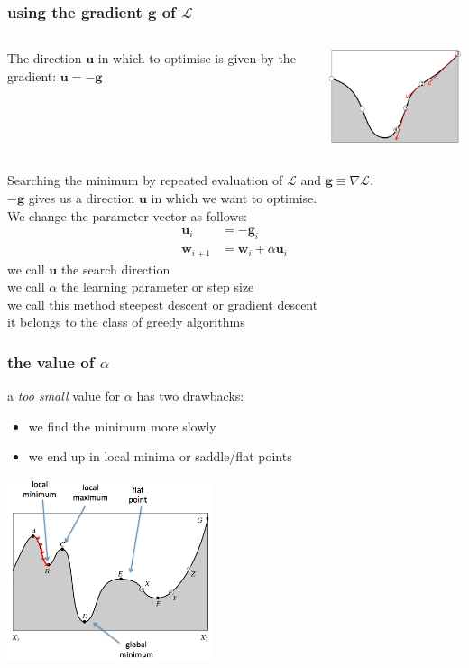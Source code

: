 \documentclass[USenglish,pdftex,compress,10pt,svgnamesi,handout]{beamer}
\def\Vec#1{\textbf{#1}}
\begin{document}
\begin{frame}
\frametitle{using the gradient $\Vec g$ of $\mathcal L$}

\begin{columns}
\begin{column}{5cm}
The direction $\Vec u$ in which to optimise is given by the gradient: $\Vec u = -\Vec g$
\end{column}
\begin{column}{5cm}
\centerline{\includegraphics[width=5cm]{pics/optimise5.png}}
\end{column}
\end{columns}
Searching the minimum by repeated evaluation of $\mathcal L$ and $\Vec g \equiv \nabla \mathcal L$. \\
$-\Vec g$ 
gives us a direction $\Vec u$  in which we want to optimise.  \\
We change the parameter vector as follows:
\begin{align}
\Vec u_i &= -\Vec g_i \\
\Vec w_{i+1} &= \Vec w_i +  \alpha \Vec u_i 
\end{align}
we call $\Vec u$ the \alert{search direction}\\
we call $\alpha$ the \alert{learning parameter} or \alert{step size}\\
we call this method \alert{steepest descent} or \alert{gradient descent}\\
it belongs to the class of {greedy algorithms}
\end{frame}



\begin{frame}
\frametitle{the value of $\alpha$}

a \textsl{too small} value for $\alpha$ has two drawbacks:
\begin{itemize}
\item we find the minimum more slowly\pause
\item we end up in local minima or saddle/flat points
\end{itemize}

\centerline{\includegraphics[width=6cm]{pics/optimise6.png}}

\end{frame}
\end{document}
